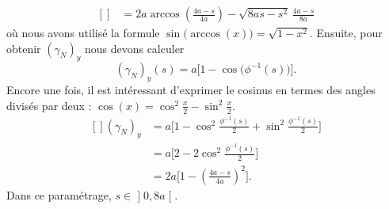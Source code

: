 \begin{example}
\begin{equation}
\begin{aligned}[]
				             & =2a\arccos\left( \frac{ 4a-s }{ 4a } \right)-\sqrt{8as-s^2}\,\frac{ 4a-s }{ 8a }
			\end{aligned}
		\end{equation}
		où nous avons utilisé la formule \( \sin\big( \arccos(x) \big)=\sqrt{1-x^2}\). Ensuite, pour obtenir \( (\gamma_N)_y\) nous devons calculer
		\begin{equation}
			(\gamma_N)_y(s)=a\big[ 1-\cos\big( \phi^{-1}(s) \big) \big].
		\end{equation}
		Encore une fois, il est intéressant d'exprimer le cosinus en termes des angles divisés par deux : \( \cos(x)=\cos^2\frac{ x }{2}-\sin^2\frac{ x }{2}\).
		\begin{equation}
			\begin{aligned}[]
				(\gamma_N)_y & =a\Big[ 1-\cos^2\frac{ \phi^{-1}(s) }{2}+\sin^2\frac{ \phi^{-1}(s) }{2} \Big] \\
				             & =a\Big[ 2-2\cos^2\frac{ \phi^{-1}(s) }{2} \Big]                               \\
				             & =2a\Big[ 1-\left( \frac{ 4a-s }{ 4a } \right)^2 \Big].
			\end{aligned}
		\end{equation}
		Dans ce paramétrage, \( s\in\mathopen] 0 , 8a \mathclose[\).
\end{example}

